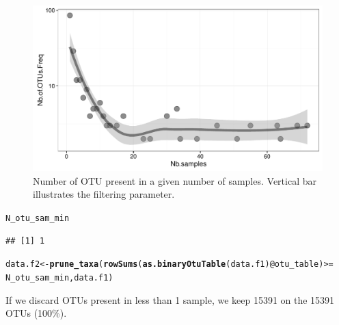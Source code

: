 \documentclass[12pt]{article}\usepackage[]{graphicx}\usepackage[]{color}
\makeatletter
\def\maxwidth{ %
  \ifdim\Gin@nat@width>\linewidth
    \linewidth
  \else
    \Gin@nat@width
  \fi
}
\newcommand{\hlopt}[1]{\textcolor[rgb]{0,0,0}{#1}}%
\newcommand{\hlstd}[1]{\textcolor[rgb]{0.345,0.345,0.345}{#1}}%
\newcommand{\hlkwb}[1]{\textcolor[rgb]{0.69,0.353,0.396}{#1}}%
\newcommand{\hlkwc}[1]{\textcolor[rgb]{0.333,0.667,0.333}{#1}}%
\newcommand{\hlkwd}[1]{\textcolor[rgb]{0.737,0.353,0.396}{\textbf{#1}}}%
\newenvironment{kframe}{%
 \def\at@end@of@kframe{}%
 \ifinner\ifhmode%
  \def\at@end@of@kframe{\end{minipage}}%
  \begin{minipage}{\columnwidth}%
 \fi\fi%
 \def\FrameCommand##1{\hskip\@totalleftmargin \hskip-\fboxsep
 \colorbox{shadecolor}{##1}\hskip-\fboxsep
     \hskip-\linewidth \hskip-\@totalleftmargin \hskip\columnwidth}%
 \MakeFramed {\advance\hsize-\width
   \@totalleftmargin\z@ \linewidth\hsize
   \@setminipage}}%
 {\par\unskip\endMakeFramed%
 \at@end@of@kframe}
\newenvironment{knitrout}{}{} %
\numberwithin{figure}{section}
\makeatother
\begin{document}
\begin{knitrout}
\begin{figure}
{\centering \includegraphics[width=\maxwidth]{figure/nbOtu_sample-1} 

}

\caption[Number of OTU present in a given number of samples]{Number of OTU present in a given number of samples. Vertical bar illustrates the filtering parameter.}\label{fig:nbOtu_sample}
\end{figure}


\end{knitrout}

\begin{knitrout}\small
{}\color{fgcolor}\begin{kframe}
\begin{alltt}
\hlstd{N_otu_sam_min}
\end{alltt}
\begin{verbatim}
## [1] 1
\end{verbatim}
\end{kframe}
\end{knitrout}

\begin{knitrout}\small
{}\color{fgcolor}\begin{kframe}
\begin{alltt}
\hlstd{data.f2} \hlkwb{<-} \hlkwd{prune_taxa}\hlstd{(}\hlkwd{rowSums}\hlstd{(}\hlkwd{as.binaryOtuTable}\hlstd{(data.f1)}\hlopt{@}\hlkwc{otu_table}\hlstd{)} \hlopt{>=}
                        \hlstd{N_otu_sam_min, data.f1)}
\end{alltt}
\end{kframe}
\end{knitrout}

If we discard OTUs present in less than 1 sample, we keep 15391 on the 15391 OTUs (100\%).
\end{document}
